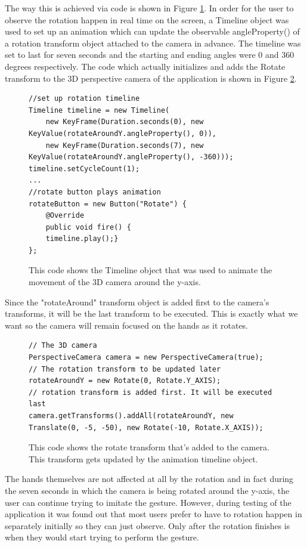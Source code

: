 The way this is achieved via code is shown in Figure \ref{fig:visualRotationCode1}. In order for the user to observe the rotation happen in real time on the screen, a Timeline object was used to set up an animation which can update the observable angleProperty() of a rotation transform object  attached to the camera in advance. The timeline was set to last for seven seconds and the starting and ending angles were 0 and 360 degrees respectively. The code which actually initializes and adds the Rotate transform to the 3D perspective camera of the application is shown in Figure \ref{fig:visualRotationCode2}. 
\begin{figure}[H]
\centering
\begin{lstlisting}
//set up rotation timeline
Timeline timeline = new Timeline(
	new KeyFrame(Duration.seconds(0), new KeyValue(rotateAroundY.angleProperty(), 0)),
	new KeyFrame(Duration.seconds(7), new KeyValue(rotateAroundY.angleProperty(), -360)));
timeline.setCycleCount(1);
... 
//rotate button plays animation
rotateButton = new Button("Rotate") {
	@Override
	public void fire() {
	timeline.play();}
};
\end{lstlisting}
\caption[Rotation Animation Timeline]{This code shows the Timeline object that was used to animate the movement of the 3D camera around the y-axis.}
\label{fig:visualRotationCode1}
\end{figure}
Since the "rotateAround" transform object is added first to the camera's transforms, it will be the last transform to be executed. This is exactly what we want so the camera will remain focused on the hands as it rotates. 
\begin{figure}[H]
\centering
\begin{lstlisting}
// The 3D camera
PerspectiveCamera camera = new PerspectiveCamera(true);
// The rotation transform to be updated later
rotateAroundY = new Rotate(0, Rotate.Y_AXIS);
// rotation transform is added first. It will be executed last
camera.getTransforms().addAll(rotateAroundY, new Translate(0, -5, -50), new Rotate(-10, Rotate.X_AXIS));
\end{lstlisting}
\caption[Rotation Transform on Camera]{This code shows the rotate transform that's added to the camera. This transform gets updated by the animation timeline object.}
\label{fig:visualRotationCode2}
\end{figure}

The hands themselves are not affected at all by the rotation and in fact during the seven seconds in which the camera is being rotated around the y-axis, the user can continue trying to imitate the gesture. However, during testing of the application it was found out that most users prefer to have to rotation happen in separately initially so they can just observe. Only after the rotation finishes is when they would start trying to perform the gesture. 
	
